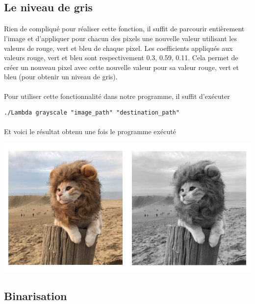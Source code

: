 \documentclass{article}
\begin{document}
\subsection{Le niveau de gris}

\paragraph{}Rien de compliqué pour réaliser cette fonction, il suffit de parcourir entièrement l'image et d'appliquer pour chacun des pixels une nouvelle valeur utilisant les valeurs de rouge, vert et bleu de chaque pixel. Les coefficients appliqués aux valeurs rouge, vert et bleu sont respectivement 0.3, 0.59, 0.11. Cela permet de créer un nouveau pixel avec cette nouvelle valeur pour sa valeur rouge, vert et bleu (pour obtenir un niveau de gris).

\paragraph{}Pour utiliser cette fonctionnalité dans notre programme, il suffit d'exécuter
\begin{lstlisting}
./Lambda grayscale "image_path" "destination_path"
\end{lstlisting}

\paragraph{}Et voici le résultat obtenu une fois le programme exécuté
\begin{center}
	\includegraphics[scale=0.45]{a}
\end{center}


\subsection{Binarisation}
\end{document}
